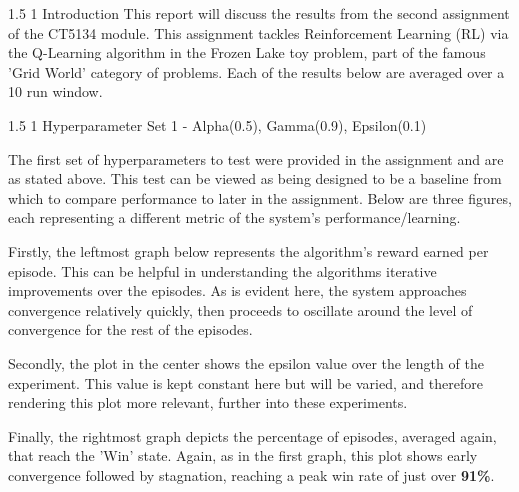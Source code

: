 \documentclass[a4paper,9pt]{scrartcl}
\title{\titletext}
\author{Michael Rice}
\makeatletter
\renewcommand{\section}{\@startsection{section}{1}{0mm}
  {1.5\baselineskip}
  {1\baselineskip} 
  {\normalfont\Large\bfseries}}
\makeatother
\begin{document}
\maketitle
\section{Introduction}
This report will discuss the results from the second assignment of the CT5134 module. This assignment tackles Reinforcement Learning (RL) via the 
Q-Learning algorithm in the Frozen Lake toy problem, part of the famous 'Grid World' category of problems. Each of the results below are averaged
over a 10 run window. 


\section{Hyperparameter Set 1 - Alpha(0.5), Gamma(0.9), Epsilon(0.1)}

The first set of hyperparameters to test were provided in the assignment and are as stated above. This test can be viewed as being designed to be 
a baseline from which to compare performance to later in the assignment. Below are three figures, each representing a different metric of the 
system's performance/learning. 

Firstly, the leftmost graph below represents the algorithm's reward earned per episode. This can be helpful in understanding the algorithms iterative
improvements over the episodes. As is evident here, the system approaches convergence relatively quickly, then proceeds to oscillate around
the level of convergence for the rest of the episodes. 

Secondly, the plot in the center shows the epsilon value over the length of the experiment. This value is kept constant here but will be varied,
and therefore rendering this plot more relevant, further into these experiments. 

Finally, the rightmost graph depicts the percentage of episodes, averaged again, that reach the 'Win' state. Again, as in the first graph, this
plot shows early convergence followed by stagnation, reaching a peak win rate of just over \textbf{91\%}.
\end{document}
